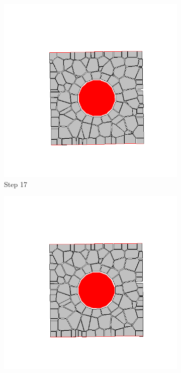 \begin{figure}[ht!]
      \begin{subfigure}{.25\textwidth}
        \centering
        \includegraphics[width=1.0\linewidth]{Files/Small_DEF/CR/DEP5-STEP(017).png}
      \caption{Step 17}
      \end{subfigure}%
      \begin{subfigure}{.25\textwidth}
        \centering
        \includegraphics[width=1.0\linewidth]{Files/Small_DEF/CR/DEP5-STEP(018).png}

\end{subfigure}
\end{figure}
